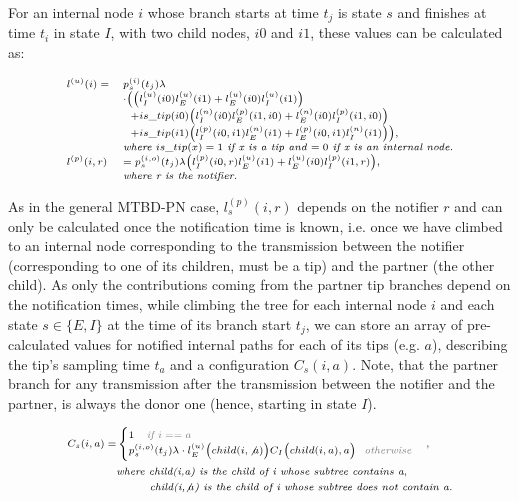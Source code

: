\documentclass[a4paper,10pt]{article}
\begin{document}
For an internal node $i$ whose branch starts at time $t_j$ is state $s$ and finishes at time $t_i$ in state $I$, with two child nodes, $i0$ and $i1$, these values can be calculated as:

\begin{equation}
\scriptsize
\begin{array}{ll}
l^{(u)}(i) =& p_s^{(i)}(t_j) \lambda \\
& \cdot \Big(\big(l_I^{(u)}(i0)l_E^{(u)}(i1) + l_E^{(u)}(i0)l_I^{(u)}(i1)\big) \\
&~~+ is\_tip(i0) \big(l_I^{(n)}(i0)l_E^{(p)}(i1,i0) + l_E^{(n)}(i0)l_I^{(p)}(i1,i0)\big)\\
&~~+ is\_tip(i1) \big(l_I^{(p)}(i0,i1)l_E^{(n)}(i1) + l_E^{(p)}(i0,i1)l_I^{(n)}(i1)\big)\Big),\\
& \textit{where } is\_tip(x) = 1 \textit{ if x is a tip and $= 0$ if x is an internal node.}\\
l^{(p)}(i, r) &= p_s^{(i,o)}(t_j) \lambda\Big(l_I^{(p)}(i0,r)l_E^{(u)}(i1) + l_E^{(u)}(i0)l_I^{(p)}(i1,r)\Big),\\
& \textit{where r is the notifier.}\\
\end{array}
\end{equation}

As in the general MTBD-PN case, $l_s^{(p)}(i, r)$ depends on the notifier $r$ and can only be calculated once the notification time is known, i.e. once we have climbed to an internal node corresponding to the transmission between the notifier (corresponding to one of its children, must be a tip) and the partner (the other child). As only the contributions coming from the partner tip branches depend on the notification times, while climbing the tree for each internal node $i$ and each state $s \in \{E, I\}$ at the time of its branch start $t_j$, we can store an array of pre-calculated values for notified internal paths for each of its tips (e.g. $a$), describing the tip's sampling time $t_a$ and a configuration $C_s(i,a)$. Note, that the partner branch for any transmission after the transmission between the notifier and the partner, is always the donor one (hence, starting in state $I$).

\begin{equation}
\scriptsize
\begin{split}
C_s(i,a) = &\begin{cases}
1 \textit{\color{gray}~~~if $i==a$}
\\
p_s^{(i,o)}(t_j) \lambda \cdot l_E^{(u)}\Big(child(i, \not a)\Big)C_I\Big(child(i, a),a\Big) \textit{\color{gray}~~otherwise}\\ 
\end{cases},
\\ &\textit{where child(i,a) is the child of i whose subtree contains a},
\\
 &\textit{~~~~~~~~child(i,$\not a$) is the child of i whose subtree does not contain a.}
\end{split}
\end{equation}
\end{document}
